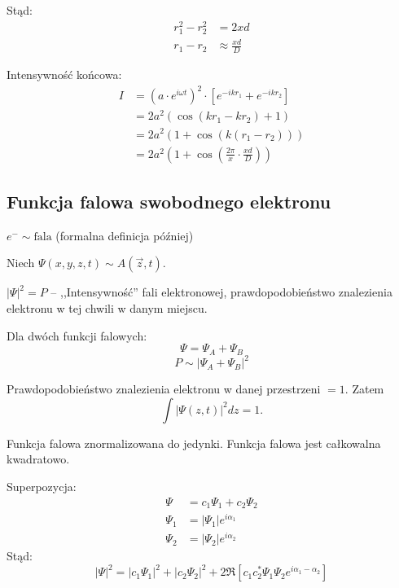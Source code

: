 Stąd:
\begin{align*}
    r_1^2 - r_2^2 &= 2xd\\
    r_1 - r_2 &\approx \frac{xd}{D}
\end{align*}

Intensywność końcowa:
\begin{align*}
    I &= \left(a\cdot e^{i\omega t}\right)^2 \cdot \left[e^{-ikr_1}+e^{-ikr_2}\right] \\
    &= 2 a^2 \left(\cos{\left(kr_1-kr_2\right)}+1\right) \\
    &= 2 a^2 \left(1 + \cos{\left(k(r_1-r_2)\right)}\right) \\
    &= 2 a^2 \left(1 + \cos{\left(\frac{2\pi}{x}\cdot\frac{xd}{D}\right)}\right)
\end{align*}

\subsection{Funkcja falowa swobodnego elektronu}

$e^- \sim \text{fala}$ (formalna definicja później)

Niech $\Psi(x,y,z,t) \sim A(\vec{z}, t)$.  

$|\Psi|^2 = P$ -- ,,Intensywność'' fali elektronowej, prawdopodobieństwo znalezienia elektronu w tej chwili w danym miejscu.

Dla dwóch funkcji falowych:
\begin{equation*}
    \Psi = \Psi_A + \Psi_B
\end{equation*}
\begin{equation*}
    P \sim |\Psi_A + \Psi_B|^2
\end{equation*}

Prawdopodobieństwo znalezienia elektronu w danej przestrzeni $= 1$. Zatem
\begin{equation*}
    \int |\Psi(z,t)|^2 dz = 1.
\end{equation*}

Funkcja falowa znormalizowana do jedynki. Funkcja falowa jest całkowalna kwadratowo.

Superpozycja:
\begin{align*}
    \Psi &= c_1 \Psi_1 + c_2 \Psi_2 \\
    \Psi_1 &= |\Psi_1| e^{i \alpha_1} \\
    \Psi_2 &= |\Psi_2| e^{i \alpha_2}
\end{align*}
Stąd:
\begin{equation*}
    |\Psi|^2 = |c_1 \Psi_1|^2 + |c_2 \Psi_2|^2 + 2 \Re \left[ c_1 c_2^* \Psi_1 \Psi_2 e^{i \alpha_1 - \alpha_2} \right]
\end{equation*}
